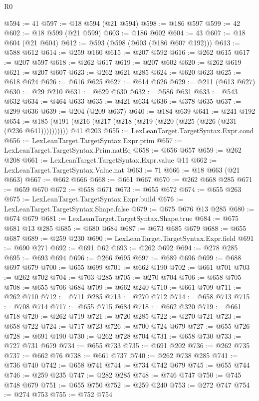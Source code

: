 \begin{lexlean}{R0}
\begin{coremodule}
@594 := 41
@597 := @18 @594 (@21 @594)
@598 := @186 @597
@599 := 42
@602 := @18 @599 (@21 @599)
@603 := @186 @602
@604 := 43
@607 := @18 @604 (@21 @604)
@612 := @593 (@598 (@603 (@186 @607 @192)))
@613 := @588 @612
@614 := @259 @160
@615 := @207 @592
@616 := @262 @615
@617 := @207 @597
@618 := @262 @617
@619 := @207 @602
@620 := @262 @619
@621 := @207 @607
@623 := @262 @621 @285
@624 := @620 @623
@625 := @618 @624
@626 := @616 @625
@627 := @614 @626
@629 := @211 (@613 @627)
@630 := @29 @210
@631 := @629 @630
@632 := @586 @631
@633 := @543 @632
@634 := @464 @633
@635 := @421 @634
@636 := @378 @635
@637 := @299 @636
@639 := @204 (@209 @637)
@640 := @184 @639
@641 := @241 @192
@654 := @185 (@191 (@216 (@217 (@218 (@219 (@220 (@225 (@226 (@231 (@236 @641)))))))))) @41 @203
@655 := LexLeanTarget.TargetSyntax.Expr.cond
@656 := LexLeanTarget.TargetSyntax.Expr.prim
@657 := LexLeanTarget.TargetSyntax.Prim.natEq
@658 := @656 @657
@659 := @262 @208
@661 := LexLeanTarget.TargetSyntax.Expr.value @11
@662 := LexLeanTarget.TargetSyntax.Value.nat
@663 := 71
@666 := @18 @663 (@21 @663)
@667 := @662 @666
@668 := @661 @667
@670 := @262 @668 @285
@671 := @659 @670
@672 := @658 @671
@673 := @655 @672
@674 := @655 @263
@675 := LexLeanTarget.TargetSyntax.Expr.build
@676 := LexLeanTarget.TargetSyntax.Shape.false
@679 := @675 @676 @13 @285
@680 := @674 @679
@681 := LexLeanTarget.TargetSyntax.Shape.true
@684 := @675 @681 @13 @285
@685 := @680 @684
@687 := @673 @685 @679
@688 := @655 @687
@689 := @259 @230
@690 := LexLeanTarget.TargetSyntax.Expr.field
@691 := @690 @271
@692 := @691 @62
@693 := @262 @692
@694 := @278 @285
@695 := @693 @694
@696 := @266 @695
@697 := @689 @696
@699 := @688 @697 @679
@700 := @655 @699
@701 := @662 @190
@702 := @661 @701
@703 := @262 @702
@704 := @703 @285
@705 := @270 @704
@706 := @658 @705
@708 := @655 @706 @684
@709 := @662 @240
@710 := @661 @709
@711 := @262 @710
@712 := @711 @285
@713 := @270 @712
@714 := @658 @713
@715 := @708 @714
@717 := @655 @715 @684
@718 := @662 @320
@719 := @661 @718
@720 := @262 @719
@721 := @720 @285
@722 := @270 @721
@723 := @658 @722
@724 := @717 @723
@726 := @700 @724 @679
@727 := @655 @726
@728 := @691 @190
@730 := @262 @728 @704
@731 := @658 @730
@733 := @727 @731 @679
@734 := @655 @733
@735 := @691 @202
@736 := @262 @735
@737 := @662 @76
@738 := @661 @737
@740 := @262 @738 @285
@741 := @736 @740
@742 := @658 @741
@744 := @734 @742 @679
@745 := @655 @744
@746 := @259 @235
@747 := @282 @285
@748 := @746 @747
@750 := @745 @748 @679
@751 := @655 @750
@752 := @259 @240
@753 := @272 @747
@754 := @274 @753
@755 := @752 @754

\end{coremodule}
\end{lexlean}
